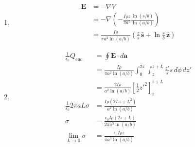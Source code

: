 \documentclass{article}
\renewcommand{\vec}[1]{\boldsymbol{\mathbf{#1}}}
\newcommand{\uvec}[1]{\hat{\vec{#1}}}
\begin{document}
\begin{enumerate}
  \item

        \begin{align*}
          \vec{E} & = -\nabla V                                                                                             \\
                  & = -\nabla \left( -\frac{I \rho z}{\pi a^2} \frac{\ln (s / b)}{\ln (a / b)} \right)                      \\
                  & = \frac{I \rho}{\pi a^2 \ln (a / b)} \left( \frac{z}{s} \,\uvec{s} + \ln \frac{s}{b} \,\uvec{z} \right)
        \end{align*}

  \item

        \begin{align*}
          \frac{1}{\epsilon_0} Q_\text{enc}     & = \oint \vec{E} \cdot d \vec{a}                                                                   \\
                                                & = \frac{I \rho}{\pi a^2 \ln (a / b)} \int_0^{2 \pi} \int_z^{z + L} \frac{z'}{s} s \,d \phi \,d z' \\
                                                & = \frac{2 I \rho}{a^2 \ln (a / b)} \left[ \frac{1}{2} z'^2 \right]_z^{z + L}                      \\
          \frac{1}{\epsilon_0} 2 \pi a L \sigma & = \frac{I \rho (2 L z + L^2)}{a^2 \ln (a / b)}                                                    \\
          \sigma                                & = \frac{\epsilon_0 I \rho (2 z + L)}{2 \pi a^3 \ln (a / b)}                                       \\
          \lim_{L \rightarrow 0} \sigma         & = \frac{\epsilon_0 I \rho z}{\pi a^3 \ln (a / b)}
        \end{align*}
\end{enumerate}

\subsection{}
\end{document}
